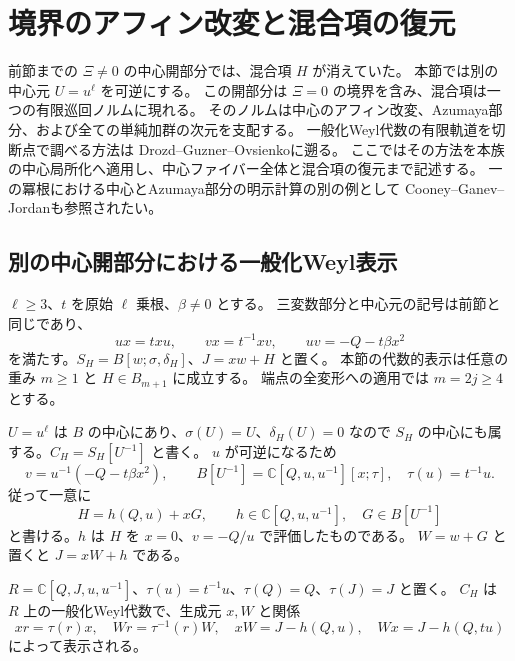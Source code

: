 \section{境界のアフィン改変と混合項の復元}
\label{sec:endpoint-boundary-v39}

前節までの $\Xi\ne0$ の中心開部分では、混合項 $H$ が消えていた。
本節では別の中心元 $U=u^\ell$ を可逆にする。
この開部分は $\Xi=0$ の境界を含み、混合項は一つの有限巡回ノルムに現れる。
そのノルムは中心のアフィン改変、Azumaya部分、および全ての単純加群の次元を支配する。
一般化Weyl代数の有限軌道を切断点で調べる方法は
Drozd--Guzner--Ovsienko\cite[\S\S2,4]{DGOBoundary39}に遡る。
ここではその方法を本族の中心局所化へ適用し、中心ファイバー全体と混合項の復元まで記述する。
一の冪根における中心とAzumaya部分の明示計算の別の例として
Cooney--Ganev--Jordan\cite{CGJBoundary39}も参照されたい。

\subsection{別の中心開部分における一般化Weyl表示}

$\ell\ge3$、$t$ を原始 $\ell$ 乗根、$\beta\ne0$ とする。
三変数部分と中心元の記号は前節と同じであり、
\[
 ux=txu,\qquad vx=t^{-1}xv,\qquad
 uv=-Q-t\beta x^2
\]
を満たす。$S_H=B[w;\sigma,\delta_H]$、$J=xw+H$ と置く。
本節の代数的表示は任意の重み $m\ge1$ と $H\in B_{m+1}$ に成立する。
端点の全変形への適用では $m=2j\ge4$ とする。

$U=u^\ell$ は $B$ の中心にあり、$\sigma(U)=U$、$\delta_H(U)=0$ なので
$S_H$ の中心にも属する。$C_H=S_H[U^{-1}]$ と書く。
$u$ が可逆になるため
\[
 v=u^{-1}(-Q-t\beta x^2),\qquad
 B[U^{-1}]=\mathbb C[Q,u,u^{-1}][x;\tau],\quad \tau(u)=t^{-1}u.
\]
従って一意に
\begin{equation}\label{eq:boundary-H-gauge-v39}
 H=h(Q,u)+xG,\qquad
 h\in\mathbb C[Q,u,u^{-1}],\quad G\in B[U^{-1}]
\end{equation}
と書ける。$h$ は $H$ を $x=0$、$v=-Q/u$ で評価したものである。
$W=w+G$ と置くと $J=xW+h$ である。

\begin{theorem}[境界を含む一般化Weyl代数]
\label{thm:boundary-GWA-v39}
$R=\mathbb C[Q,J,u,u^{-1}]$、$\tau(u)=t^{-1}u$、$\tau(Q)=Q$、$\tau(J)=J$ と置く。
$C_H$ は $R$ 上の一般化Weyl代数で、生成元 $x,W$ と関係
\begin{equation}\label{eq:boundary-GWA-v39}
 xr=\tau(r)x,\quad Wr=\tau^{-1}(r)W,\quad
 xW=J-h(Q,u),\quad Wx=J-h(Q,tu)
\end{equation}
によって表示される。
\end{theorem}

